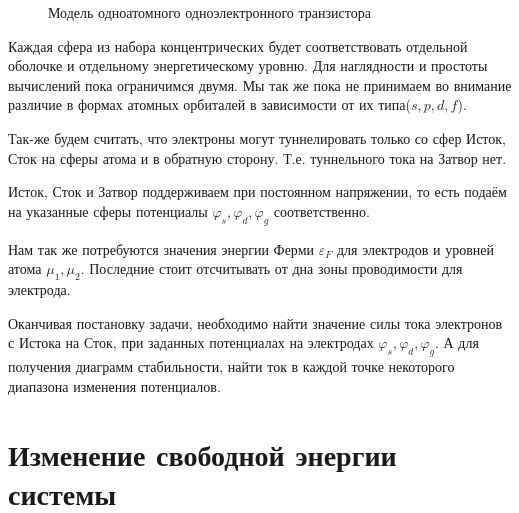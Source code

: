 \documentclass[12pt,a4paper]{report}
\begin{document}
\begin{figure}[h]
	\caption{Модель одноатомного одноэлектронного транзистора}
	\label{fig:SASET model}
\end{figure}
Каждая сфера из набора концентрических будет соответствовать отдельной оболочке и отдельному энергетическому уровню. Для наглядности и простоты вычислений пока ограничимся двумя. Мы так же пока не принимаем во внимание различие в формах атомных орбиталей в зависимости от их типа($s,p,d,f$). 

Так-же будем считать, что электроны могут туннелировать только со сфер Исток, Сток на сферы атома и в обратную сторону. Т.е. туннельного тока на Затвор нет.

Исток, Сток и Затвор поддерживаем при постоянном напряжении, то есть подаём на указанные сферы потенциалы $\varphi_s, \varphi_d, \varphi_g$ соответственно.

Нам так же потребуются значения энергии Ферми $\varepsilon_F$ для электродов и уровней атома $\mu_1, \mu_2$. Последние стоит отсчитывать от дна зоны проводимости для электрода.

Оканчивая постановку задачи, необходимо найти значение силы тока электронов с Истока на Сток, при заданных потенциалах на электродах $\varphi_s, \varphi_d, \varphi_g$. А для получения диаграмм стабильности, найти ток в каждой точке некоторого диапазона изменения потенциалов.
\section*{Изменение свободной энергии системы}
\end{document}
